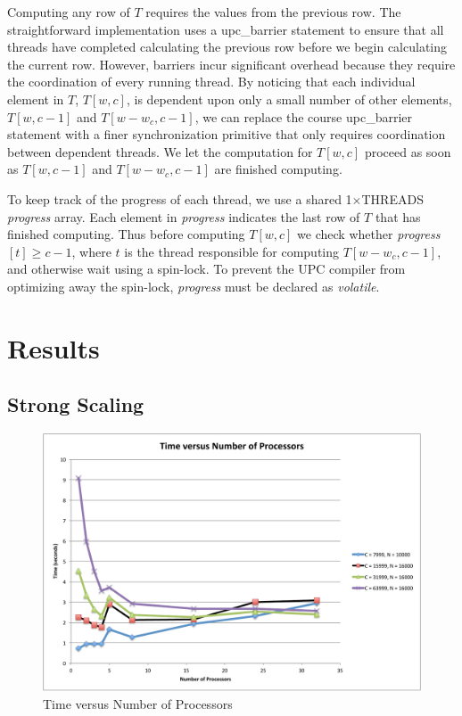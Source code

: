 \documentclass[11pt]{article} %
\begin{document}
Computing any row of $T$ requires the values from the previous row. The straightforward implementation uses a upc\_barrier statement to ensure that all threads have completed calculating the previous row before we begin calculating the current row. However, barriers incur significant overhead because they require the coordination of every running thread. By noticing that each individual element in $T$, $T[w,c]$, is dependent upon only a small number of other elements, $T[w,c-1]$ and $T[w-w_c,c-1]$, we can replace the course upc\_barrier statement with a finer synchronization primitive that only requires coordination between dependent threads. We let the computation for $T[w,c]$ proceed as soon as $T[w,c-1]$ and $T[w-w_c,c-1]$ are finished computing.

To keep track of the progress of each thread, we use a shared 1$\times$THREADS \emph{progress} array. Each element in \emph{progress} indicates the last row of $T$ that has finished computing. Thus before computing $T[w,c]$ we check whether \emph{progress}$[t] \geq c-1$, where $t$ is the thread responsible for computing $T[w-w_c,c-1]$, and otherwise wait using a spin-lock. To prevent the UPC compiler from optimizing away the spin-lock, \emph{progress} must be declared as \emph{volatile}.

\section{Results}

\subsection{Strong Scaling}

\begin{figure}
\begin{centering}
\includegraphics[width=0.5\paperwidth]{figures/TvsP.pdf}
\caption{Time versus Number of Processors}
\label{TvsP}
\end{centering}
\end{figure}
\end{document}

